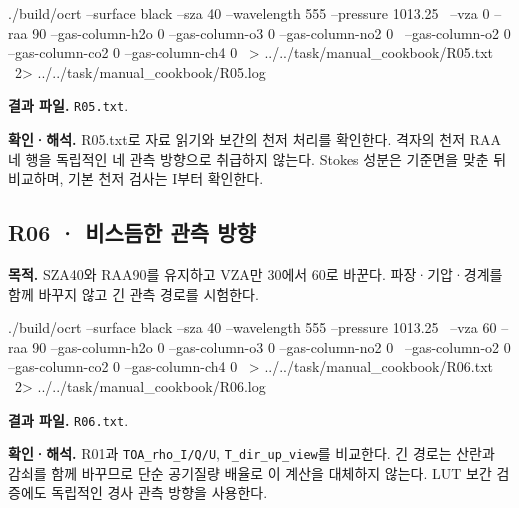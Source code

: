 \noindent\begin{minipage}{\linewidth}
\begin{ManualCode}

./build/ocrt --surface black --sza 40 --wavelength 555 --pressure 1013.25 \
  --vza 0 --raa 90 --gas-column-h2o 0 --gas-column-o3 0 --gas-column-no2 0 \
  --gas-column-o2 0 --gas-column-co2 0 --gas-column-ch4 0 \
  > ../../task/manual_cookbook/R05.txt \
  2> ../../task/manual_cookbook/R05.log

\end{ManualCode}
\end{minipage}\par

\textbf{결과 파일. }\texttt{R05.txt}.

\textbf{확인·해석. }R05.txt로 자료 읽기와 보간의 천저 처리를 확인한다. 격자의 천저 RAA 네 행을 독립적인 네 관측 방향으로 취급하지 않는다. Stokes 성분은 기준면을 맞춘 뒤 비교하며, 기본 천저 검사는 I부터 확인한다.

\Needspace{17\baselineskip}

\subsection{R06 · 비스듬한 관측 방향}
\label{sec:auto:09_cookbook:2.6}

\label{recipe:R06}

\textbf{목적. }SZA40\textdegree{}와 RAA90\textdegree{}를 유지하고 VZA만 30\textdegree{}에서 60\textdegree{}로 바꾼다. 파장·기압·경계를 함께 바꾸지 않고 긴 관측 경로를 시험한다.

\noindent\begin{minipage}{\linewidth}
\begin{ManualCode}

./build/ocrt --surface black --sza 40 --wavelength 555 --pressure 1013.25 \
  --vza 60 --raa 90 --gas-column-h2o 0 --gas-column-o3 0 --gas-column-no2 0 \
  --gas-column-o2 0 --gas-column-co2 0 --gas-column-ch4 0 \
  > ../../task/manual_cookbook/R06.txt \
  2> ../../task/manual_cookbook/R06.log

\end{ManualCode}
\end{minipage}\par

\textbf{결과 파일. }\texttt{R06.txt}.

\textbf{확인·해석. }R01과 \texttt{TOA\_\allowbreak{}rho\_\allowbreak{}I/\allowbreak{}Q/\allowbreak{}U}, \texttt{T\_\allowbreak{}dir\_\allowbreak{}up\_\allowbreak{}view}를 비교한다. 긴 경로는 산란과 감쇠를 함께 바꾸므로 단순 공기질량 배율로 이 계산을 대체하지 않는다. LUT 보간 검증에도 독립적인 경사 관측 방향을 사용한다.

